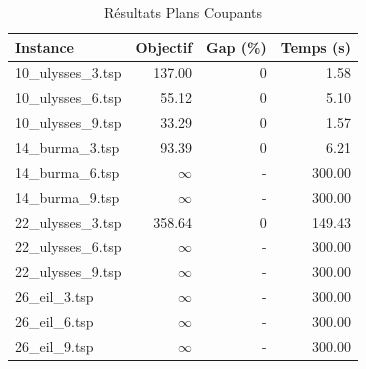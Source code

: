 \begin{table}[H]
\centering
\caption{Résultats Plans Coupants}
\small
\begin{tabular}{|l|r|r|r|}
\hline
\textbf{Instance} & \textbf{Objectif} & \textbf{Gap (\%)} & \textbf{Temps (s)} \\
\hline
10\_ulysses\_3.tsp & 137.00 & 0 & 1.58 \\
10\_ulysses\_6.tsp & 55.12 & 0 & 5.10 \\
10\_ulysses\_9.tsp & 33.29 & 0 & 1.57 \\
14\_burma\_3.tsp & 93.39 & 0 & 6.21 \\
14\_burma\_6.tsp & $\infty$ & - & 300.00 \\
14\_burma\_9.tsp & $\infty$ & - & 300.00 \\
22\_ulysses\_3.tsp & 358.64 & 0 & 149.43 \\
22\_ulysses\_6.tsp & $\infty$ & - & 300.00 \\
22\_ulysses\_9.tsp & $\infty$ & - & 300.00 \\
26\_eil\_3.tsp & $\infty$ & - & 300.00 \\
26\_eil\_6.tsp & $\infty$ & - & 300.00 \\
26\_eil\_9.tsp & $\infty$ & - & 300.00 \\
\hline
\end{tabular}
\end{table}
